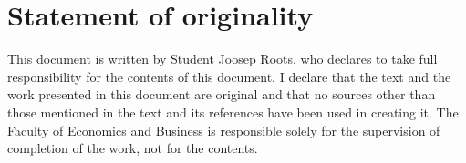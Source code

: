 \chapter{Statement of originality}

This document is written by Student Joosep Roots, who
declares to take full responsibility for the contents of this document.
I declare that the text and the work presented in this document are original and that no
sources other than those mentioned in the text and its references have been used in
creating it.
The Faculty of Economics and Business is responsible solely for the supervision of
completion of the work, not for the contents.